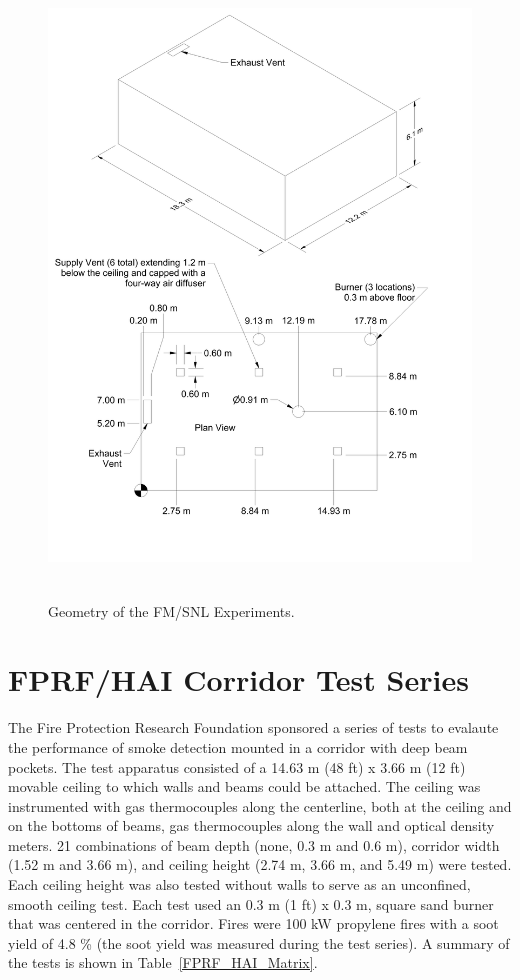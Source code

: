 \begin{figure}
\begin{center}
\includegraphics[height=6.5in]{FIGURES/FM_SNL/FM_SNL_Drawing}
\end{center}
\caption[Geometry of the FM/SNL Experiments]{Geometry of the FM/SNL Experiments.}
\label{FM_SNL_Drawing}
\end{figure}

\clearpage


\section{FPRF/HAI Corridor Test Series}

The Fire Protection Research Foundation sponsored a series of tests to evalaute the performance of smoke detection mounted in a corridor with deep beam pockets.  The test apparatus consisted of a 14.63 m (48 ft) x 3.66 m (12 ft) movable ceiling to which walls and beams could be attached.  The ceiling was instrumented with gas thermocouples along the centerline,  both at the ceiling and on the bottoms of beams, gas thermocouples along the wall and optical density meters.  21 combinations of beam depth (none, 0.3 m and 0.6 m), corridor width (1.52 m and 3.66 m), and ceiling height (2.74 m, 3.66 m, and 5.49 m) were tested.  Each ceiling height was also tested without walls to serve as an unconfined, smooth ceiling test.  Each test used an 0.3 m (1 ft) x 0.3 m, square sand burner that was centered in the corridor.  Fires were 100 kW propylene fires with a soot yield of 4.8 \% (the soot yield was measured during the test series).  A summary of the tests is shown in Table~\ref{FPRF_HAI_Matrix}.

